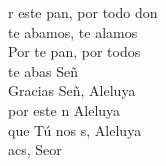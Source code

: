 \documentclass[12pt]{article}
\begin{document}
\begin{multicols*}{2}
\begin{cancion}%
	r este pan, por todo don\\
	te abamos, te alamos\\
	Por te pan, por todos\\
	te abas Señ \\
\jump
	Gracias Señ, Aleluya \\
	por este n Aleluya\\
	que Tú nos s, Aleluya\\
	acs, Seor\\
\end{cancion}%


\end{multicols*}
\end{document}
